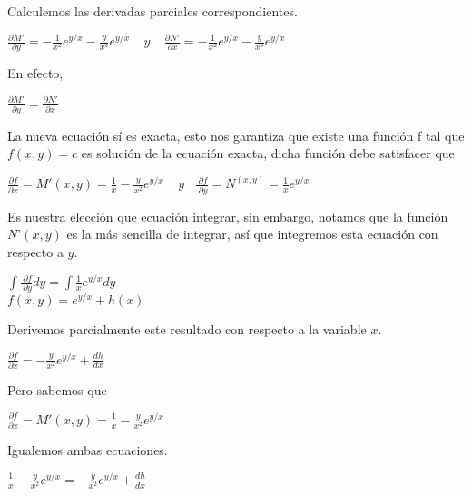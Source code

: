 \documentclass[l etterpaper,11pt]{article}
\begin{document}
Calculemos las derivadas parciales correspondientes.
\begin{center}

$\frac{\partial M\prime}{\partial y}=-\frac{1}{x^2}e^{y/x}-\frac{y}{x^3}e^{y/x}\ \ \ \ \ y\ \ \ \ \ \frac{\partial N\prime}{\partial x}=-\frac{1}{x^2}e^{y/x}-\frac{y}{x^3}e^{y/x}$\\
\end{center}

En efecto,
\begin{center}

$\frac{\partial M\prime}{\partial y}=\frac{\partial N\prime}{\partial x}$\\
\end{center}

La nueva ecuación sí es exacta, esto nos garantiza que existe una función f tal que $ f(x,y)=c $ es solución de la ecuación exacta, dicha función debe satisfacer que
\begin{center}

$\frac{\partial f}{\partial x}=M\prime(x,y)=\frac{1}{x}-\frac{y}{x^2}e^{y/x}\ \ \ \ \ y\ \ \ \ \frac{\ \partial f}{\ \partial y}=N^(x,y)=\frac{1}{x}e^{y/x}$\\
\end{center}

Es nuestra elección que ecuación integrar, sin embargo, notamos que la función $ N’(x,y) $ es la más sencilla de integrar, así que integremos esta ecuación con respecto a $ y $.
\begin{center}

$\int\frac{\ \partial f}{\ \partial y}dy=\int\frac{1}{x}e^{y/x}dy$\\
$f(x,y)=e^{y/x}+h(x) $\\
\end{center}

Derivemos parcialmente este resultado con respecto a la variable $ x$.
\begin{center}

$\frac{\partial f}{\partial x}=-\frac{y}{x^2}e^{y/x}+\frac{dh}{dx}$\\
\end{center}

Pero sabemos que
\begin{center}

$\frac{\partial f}{\partial x}=M\prime(x,y)=\frac{1}{x}-\frac{y}{x^2}e^{y/x}$\\
\end{center}

Igualemos ambas ecuaciones.
\begin{center}

$\frac{1}{x}-\frac{y}{x^2}e^{y/x}=-\frac{y}{x^2}e^{y/x}+\frac{dh}{dx}$\\
\end{center}
\end{document}
